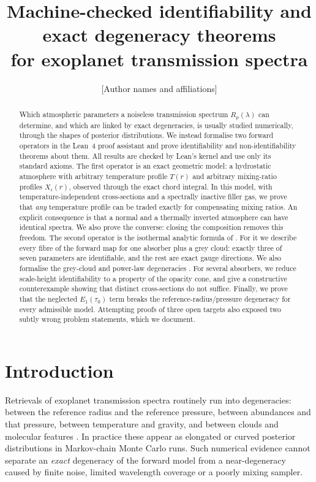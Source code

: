 \documentclass[11pt]{article}
\title{Machine-checked identifiability and exact degeneracy theorems\\
for exoplanet transmission spectra}
\author{[Author names and affiliations]}
\date{}
\theoremstyle{definition}
\theoremstyle{remark}
\begin{document}
\maketitle

\begin{abstract}
Which atmospheric parameters a noiseless transmission spectrum $R_p(\lambda)$ can determine,
and which are linked by exact degeneracies, is usually studied numerically, through the shapes
of posterior distributions. We instead formalise two forward operators in the Lean~4 proof
assistant and prove identifiability and non-identifiability theorems about them. All results
are checked by Lean's kernel and use only its standard axioms. The first operator is an exact
geometric model: a hydrostatic atmosphere with arbitrary temperature profile $T(r)$ and
arbitrary mixing-ratio profiles $X_i(r)$, observed through the exact chord integral. In this
model, with temperature-independent cross-sections and a spectrally inactive filler gas, we
prove that \emph{any} temperature profile can be traded exactly for compensating mixing ratios.
An explicit consequence is that a normal and a thermally inverted atmosphere can have
identical spectra. We also prove the converse: closing the composition removes this freedom.
The second operator is the isothermal analytic formula of \citet{HengKitzmann2017}. For it we
describe every fibre of the forward map for one absorber plus a grey cloud: exactly three of
seven parameters are identifiable, and the rest are exact gauge directions. We also formalise
the grey-cloud and power-law degeneracies \citep{LecavelierDesEtangs2008}. For several
absorbers, we reduce scale-height identifiability to a property of the opacity cone, and give
a constructive counterexample showing that distinct cross-sections do not suffice. Finally, we
prove that the neglected $E_1(\tau_0)$ term breaks the reference-radius/pressure degeneracy for
every admissible model. Attempting proofs of three open targets also exposed two subtly wrong
problem statements, which we document.
\end{abstract}

\section{Introduction}

Retrievals of exoplanet transmission spectra routinely run into degeneracies: between the
reference radius and the reference pressure, between abundances and that pressure, between
temperature and gravity, and between clouds and molecular features
\citep{BennekeSeager2012,Griffith2014,HengKitzmann2017,WelbanksMadhusudhan2019}. In
practice these appear as elongated or curved posterior distributions in Markov-chain Monte
Carlo runs. Such numerical evidence cannot separate an \emph{exact} degeneracy of the forward
model from a near-degeneracy caused by finite noise, limited wavelength coverage or a poorly
mixing sampler.
\end{document}

